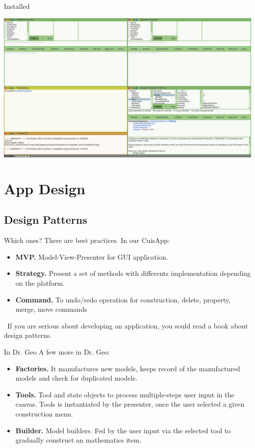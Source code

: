 \documentclass{beamer}
\newcommand{\tip}{\boldmath{\textcolor{red}{$\Rightarrow$}}}
\begin{document}
%
\begin{frame}{Installed}
  \begin{center}
    \includegraphics[width=\textwidth]{CuisAppIDE.png}
  \end{center}
\end{frame}
\section{App Design}
\subsection{Design Patterns}
\begin{frame}{Which ones?}
  There are best practices. In our CuisApp:
  \begin{itemize}
  \item \textbf{MVP.} Model-View-Presenter for GUI application.
  \item \textbf{Strategy.} Present a set of methods with differents
    implementation depending on the platform.
  \item \textbf{Command.} To undo/redo operation for construction,
    delete, property, merge, move commands
  \end{itemize}

  \tip\ If you are serious about developing an application, you sould
  read a book about design patterns\cite{designPattern}.

\end{frame}
%
\begin{frame}{In Dr. Geo}
  A few more in Dr. Geo:
  \begin{itemize}
  \item \textbf{Factories.} It manufactures new models, keeps record
    of the manufactured models and check for duplicated models.
  \item \textbf{Tools.} Tool and state objects to process
    multiple-steps user input in the canvas. Tools is instantiated by
    the presenter, once the user selected a given construction menu.
  \item \textbf{Builder.} Model builders. Fed by the user input via
    the selected tool to gradually construct an mathematics item.
  \end{itemize}
\end{frame}
\end{document}
